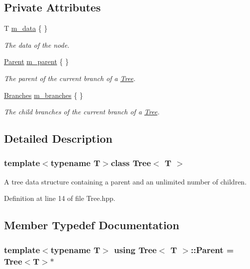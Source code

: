 \subsection*{Private Attributes}
\begin{DoxyCompactItemize}
\item 
T \hyperlink{classTree_a4ace53b9a58c7c6a96b85be871471f62}{m\+\_\+data} \{ \}
\begin{DoxyCompactList}\small\item\em The data of the node. \end{DoxyCompactList}\item 
\hyperlink{classTree_a90c6da3cbc82d2a2652e7ceb19ef8f6a}{Parent} \hyperlink{classTree_ac742fce39cb2288663f891d77c3e4748}{m\+\_\+parent} \{ \}
\begin{DoxyCompactList}\small\item\em The parent of the current branch of a \hyperlink{classTree}{Tree}. \end{DoxyCompactList}\item 
\hyperlink{classTree_abb3de7e9104700b780c956a6da8a3582}{Branches} \hyperlink{classTree_ab9520d0aea2873cd23caa31f6d6aa823}{m\+\_\+branches} \{ \}
\begin{DoxyCompactList}\small\item\em The child branches of the current branch of a \hyperlink{classTree}{Tree}. \end{DoxyCompactList}\end{DoxyCompactItemize}


\subsection{Detailed Description}
\subsubsection*{template$<$typename T$>$class Tree$<$ T $>$}

A tree data structure containing a parent and an unlimited number of children. 



Definition at line 14 of file Tree.\+hpp.



\subsection{Member Typedef Documentation}
\hypertarget{classTree_a90c6da3cbc82d2a2652e7ceb19ef8f6a}{
\subsubsection[{Parent}]{\setlength{\rightskip}{0pt plus 5cm}template$<$typename T$>$ using {\bf Tree}$<$ T $>$\+::{\bf Parent} =  {\bf Tree}$<$T$>$$\ast$}}\label{classTree_a90c6da3cbc82d2a2652e7ceb19ef8f6a}


